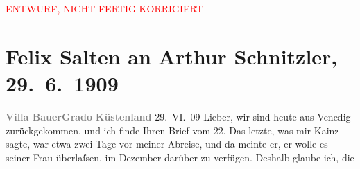
\begin{center}
            \textcolor{red}{ENTWURF, NICHT FERTIG KORRIGIERT}
                      \end{center}
            
         
         \renewcommand{\erwaehntePersonen}{Personen: Josef Kainz, Margarethe Kainz, Anna Katharina Rehmann, Paul Salten, Olga Schnitzler, Heinrich Schnitzler}
         \renewcommand{\erwaehnteInstitutionen}{Institutionen: Burgtheater}
         \renewcommand{\erwaehnteOrte}{Orte: Grado, Lido, Venedig, Villa Bauer, Wien}
         \renewcommand{\erwaehnteWerke}{Werke: Der neue Vertrag von Josef Kainz’, Neue Freie Presse}
               \section[Felix Salten an Arthur Schnitzler, 29. 6. 1909]{ Felix Salten an Arthur Schnitzler, 29. 6. 1909}\nopagebreak{}\rehead{ }\begin{ledgroupsized}[t]{13cm}\normalsize\beginnumbering \toendnotes[C]{\smallbreak\pagebreak[2]} 
\toendnotes[C]{\smallbreak}\pstart
           \noindent{}{\pb}\textcolor{gray}{\textbf{Villa Bauer}}\hfill \textcolor{gray}{\textbf{Grado}}\pend
           \pstart
           \raggedleft{}\textcolor{gray}{\textbf{Küstenland}}\pend
           \pstart
           \raggedleft{}29. VI. 09\pend
           \pstart{}Lieber,\pend\pstart
            wir sind heute aus Venedig zurückgekommen, und
               ich finde Ihren Brief vom 22. Das letzte, was mir Kainz sagte, war etwa zwei Tage vor meiner Abreise, und da meinte er, er
               wolle es seiner Frau
               überlaſsen, im Dezember darüber zu verfügen. Deshalb glaube ich, die \label{K_L03501-1v}
\end{ledgroupsized}
